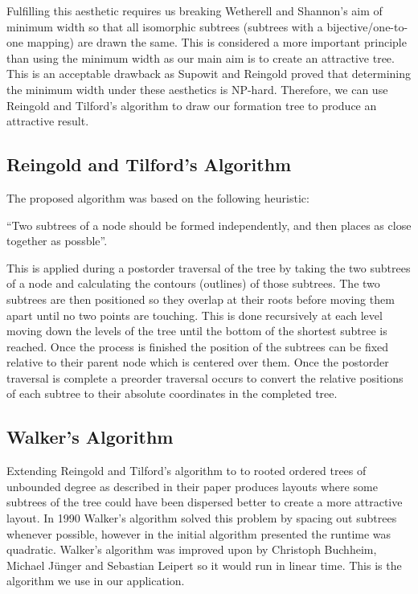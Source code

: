 \documentclass{report}
\begin{document}
Fulfilling this aesthetic requires us breaking Wetherell and Shannon's aim of minimum width so that all isomorphic subtrees (subtrees with a bijective/one-to-one mapping) are drawn the same. This is considered a more important principle than using the minimum width as our main aim is to create an attractive tree. This is an acceptable drawback as Supowit and Reingold proved that determining the minimum width under these aesthetics is NP-hard\cite{complexityofdrawingtreesnicely}. Therefore, we can use Reingold and Tilford's algorithm to draw our formation tree to produce an attractive result. 

\subsection{Reingold and Tilford's Algorithm}

The proposed algorithm was based on the following heuristic: 

``Two subtrees of a node should be formed independently, and then places as close together as possble''\cite{tidierdrawingsws}.

This is applied during a postorder traversal of the tree by taking the two subtrees of a node and calculating the contours (outlines) of those subtrees. The two subtrees are then positioned so they overlap at their roots before moving them apart until no two points are touching. This is done recursively at each level moving down the levels of the tree until the bottom of the shortest subtree is reached. Once the process is finished the position of the subtrees can be fixed relative to their parent node which is centered over them. Once the postorder traversal is complete a preorder traversal occurs to convert the relative positions of each subtree to their absolute coordinates in the completed tree.

\subsection{Walker's Algorithm}

Extending Reingold and Tilford's algorithm to to rooted ordered trees of unbounded degree as described in their paper produces layouts where some subtrees of the tree could have been dispersed better to create a more attractive layout. In 1990 Walker's algorithm solved this problem by spacing out subtrees whenever possible, however in the initial algorithm presented the runtime was quadratic. Walker's algorithm was improved upon by Christoph Buchheim, Michael J\"unger and Sebastian Leipert so it would run in linear time\cite{improvingwalkers}. This is the algorithm we use in our application.
\end{document}
